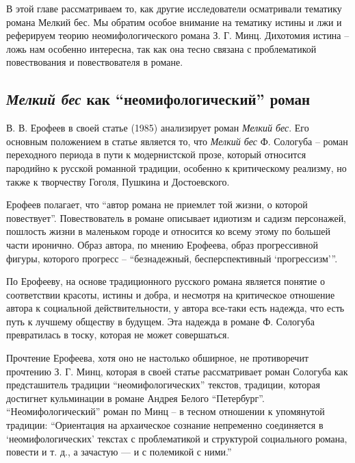 \documentclass[12pt,a4paper]{article}
\begin{document}
В этой главе рассматриваем то, как другие исследователи осматривали тематику романа Мелкий бес. Мы обратим особое внимание на тематику истины и лжи и реферируем теорию неомифологического романа З. Г. Минц. Дихотомия истина – ложь нам особенно интересна, так как она тесно связана с проблематикой повествования и повествователя в романе.


\subsection{\emph{Мелкий бес} как \enquote{неомифологический} роман}

В. В. Ерофеев в своей статье  (1985) анализирует роман \emph{Мелкий бес}. Его основным положением в статье является то, что \emph{Мелкий бес} Ф. Сологуба -- роман переходного периода в пути к модернистской прозе, который относится пародийно к русской романной традиции, особенно к критическому реализму, но также к творчеству Гоголя, Пушкина и Достоевского. \parencite[145.]{jerofeev1985}


Ерофеев полагает, что \enquote{автор романа не приемлет той жизни, о которой повествует}. Повествователь в романе описывает идиотизм и садизм персонажей, пошлость жизни в маленьком городе и относится ко всему этому по большей части иронично. Образ автора, по мнению Ерофеева, образ прогрессивной фигуры, которого прогресс -- \enquote{безнадежный, бесперспективный \enquote{прогрессизм}}. \Parencite[146.]{jerofeev1985}


По Ерофееву, на основе традиционного русского романа является понятие о соответствии красоты, истины и добра, и несмотря на критическое отношение автора к социальной действительности, у автора все-таки есть надежда, что есть путь к лучшему обществу в будущем. Эта надежда в романе Ф. Сологуба превратилась в тоску, которая не может совершаться.  \parencite[158.]{jerofeev1985}



Прочтение Ерофеева, хотя оно не настолько обширное, не противоречит прочтению З. Г. Минц, которая в  своей статье  \parencite*{mints2004} рассматривает роман Сологуба как предсташитель традиции \enquote{неомифологических} текстов, традиции, которая достигнет кульминации в романе Андрея Белого \enquote{Петербург}. \enquote{Неомифологический} роман по Минц -- в тесном отношении к упомянутой традиции: \enquote{Ориентация на архаическое сознание непременно соединяется в \enquote{неомифологических} текстах с проблематикой и структурой социального романа, повести и т. д., а зачастую — и с полемикой с ними.} \Parencite[60.]{mints2004} 
\end{document}
